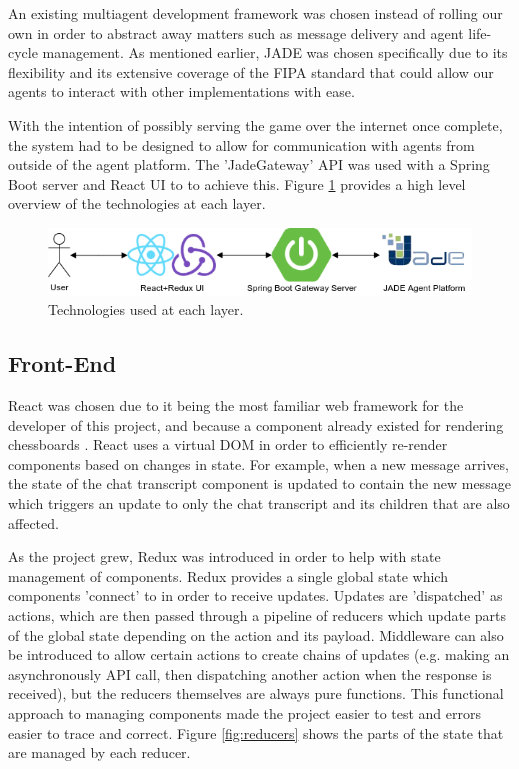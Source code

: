 \documentclass{article}
\begin{document}
An existing multiagent development framework was chosen instead of rolling our own in order to abstract away matters such as message delivery and agent life-cycle management. As mentioned earlier, JADE was chosen specifically due to its flexibility and its extensive coverage of the FIPA standard that could allow our agents to interact with other implementations with ease. 

With the intention of possibly serving the game over the internet once complete, the system had to be designed to allow for communication with agents from outside of the agent platform. The 'JadeGateway' API was used with a Spring Boot server and React UI to to achieve this. Figure \ref{fig:highlevelarchitecture} provides a high level overview of the technologies at each layer.

\begin{figure}[!ht]
	\centering
	\includegraphics[width=\linewidth]{images/highlevelarchitecture}
	\caption{Technologies used at each layer.}
	\label{fig:highlevelarchitecture}
\end{figure}

\subsection{Front-End}

React \cite{reactjs} was chosen due to it being the most familiar web framework for the developer of this project, and because a component already existed for rendering chessboards \cite{chessboardjsx}. React uses a virtual DOM in order to efficiently re-render components based on changes in state. For example, when a new message arrives, the state of the chat transcript component is updated to contain the new message which triggers an update to only the chat transcript and its children that are also affected. 

As the project grew, Redux \cite{redux} was introduced in order to help with state management of components. Redux provides a single global state which components 'connect' to in order to receive updates. Updates are 'dispatched' as actions, which are then passed through a pipeline of reducers which update parts of the global state depending on the action and its payload. Middleware can also be introduced to allow certain actions to create chains of updates (e.g. making an asynchronously API call, then dispatching another action when the response is received), but the reducers themselves are always pure functions. This functional approach to managing components made the project easier to test and errors easier to trace and correct. Figure \ref{fig:reducers} shows the parts of the state that are managed by each reducer.
\end{document}
